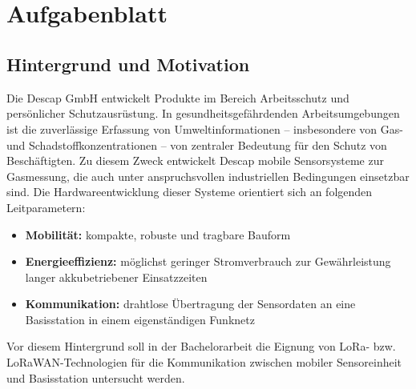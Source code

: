 
\maketitle
\clearpage
~
\newpage


\clearpage

    {

    }
    {
      ~
      \newpage
      \vfill
      \section*{Aufgabenblatt}
      \subsection*{Hintergrund und Motivation} 

      Die Descap GmbH entwickelt Produkte im Bereich Arbeitsschutz und persönlicher Schutzausrüstung.
      In gesundheitsgefährdenden Arbeitsumgebungen ist die zuverlässige Erfassung von
      Umweltinformationen – insbesondere von Gas- und Schadstoffkonzentrationen – von zentraler
      Bedeutung für den Schutz von Beschäftigten. Zu diesem Zweck entwickelt Descap mobile
      Sensorsysteme zur Gasmessung, die auch unter anspruchsvollen industriellen Bedingungen
      einsetzbar sind.
      Die Hardwareentwicklung dieser Systeme orientiert sich an folgenden Leitparametern:

      \begin{itemize}[noitemsep]
        \item \textbf{Mobilität:} kompakte, robuste und tragbare Bauform
        \item \textbf{Energieeffizienz:} möglichst geringer Stromverbrauch zur Gewährleistung langer akkubetriebener Einsatzzeiten
        \item \textbf{Kommunikation:} drahtlose Übertragung der Sensordaten an eine Basisstation in einem eigenständigen Funknetz
      \end{itemize}

      Vor diesem Hintergrund soll in der Bachelorarbeit die Eignung von LoRa- bzw. LoRaWAN-Technologien
      für die Kommunikation zwischen mobiler Sensoreinheit und Basisstation untersucht werden.

}
